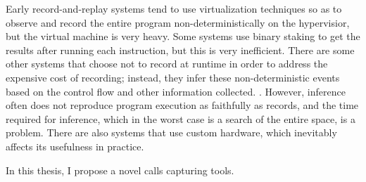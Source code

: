 Early record-and-replay systems tend to use virtualization techniques so as to observe and record the entire program non-deterministically on the hypervisior, but the virtual machine is very heavy. \cite{dunlap_revirt_2003} Some systems use binary staking to get the results after running each instruction, but this is very inefficient. \cite{bhansali_framework_2006} There are some other systems that choose not to record at runtime in order to address the expensive cost of recording; instead, they infer these non-deterministic events based on the control flow and other information collected. \cite{altekar_odr_2009,cui_rept_2018}. However, inference often does not reproduce program execution as faithfully as records, and the time required for inference, which in the worst case is a search of the entire space, is a problem. There are also systems that use custom hardware, which inevitably affects its usefulness in practice. 


In this thesis, I propose a novel calls capturing tools.

